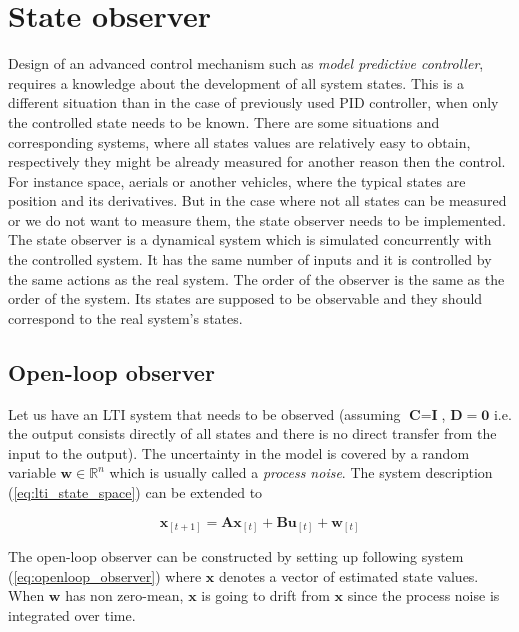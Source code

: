 \section{State observer}

Design of an advanced control mechanism such as \textit{model predictive controller}, requires a knowledge about the development of all system states. This is a different situation than in the case of previously used PID controller, when only the controlled state needs to be known. There are some situations and corresponding systems, where all states values are relatively easy to obtain, respectively they might be already measured for another reason then the control. For instance space, aerials or another vehicles, where the typical states are position and its derivatives. But in the case where not all states can be measured or we do not want to measure them, the state observer needs to be implemented. The state observer is a dynamical system which is simulated concurrently with the controlled system. It has the same number of inputs and it is controlled by the same actions as the real system. The order of the observer is the same as the order of the system. Its states are supposed to be observable and they should correspond to the real system's states.

\subsection{Open-loop observer}

Let us have an LTI system that needs to be observed (assuming $\textbf{C} = \textbf{I}$, $\textbf{D} = \mathbf{0}$ i.e. the output consists directly of all states and there is no direct transfer from the input to the output). The uncertainty in the model is covered by a random variable $\textbf{w} \in \mathbb{R}^n$ which is usually called a \emph{process noise}. The system description (\ref{eq:lti_state_space}) can be extended to

\begin{equation}
\textbf{x}_{[t+1]} = \textbf{A}\textbf{x}_{[t]} + \textbf{B}\textbf{u}_{[t]} + \textbf{w}_{[t]}
\label{eq:lti_for_observer}
\end{equation}

The open-loop observer can be constructed by setting up following system (\ref{eq:openloop_observer}) where $\textbf{\^x}$ denotes a vector of estimated state values. When $\textbf{w}$ has non zero-mean, $\textbf{\^x}$ is going to drift from $\textbf{x}$ since the process noise is integrated over time.

